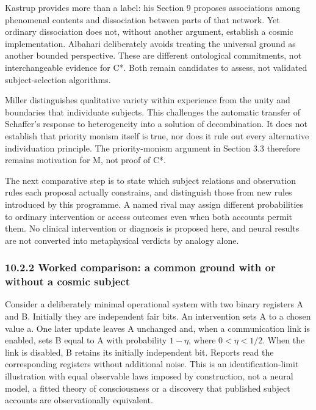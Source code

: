 \documentclass[
  10pt,
  a4paper,
]{article}
\begin{document}
Kastrup provides more than a label: his Section 9 proposes associations
among phenomenal contents and dissociation between parts of that
network. Yet ordinary dissociation does not, without another argument,
establish a cosmic implementation. Albahari deliberately avoids treating
the universal ground as another bounded perspective. These are different
ontological commitments, not interchangeable evidence for C*. Both
remain candidates to assess, not validated subject-selection algorithms.

Miller distinguishes qualitative variety within experience from the
unity and boundaries that individuate subjects. This challenges the
automatic transfer of Schaffer's response to heterogeneity into a
solution of decombination. It does not establish that priority monism
itself is true, nor does it rule out every alternative individuation
principle. The priority-monism argument in Section 3.3 therefore remains
motivation for M, not proof of C*.

The next comparative step is to state which subject relations and
observation rules each proposal actually constrains, and distinguish
those from new rules introduced by this programme. A named rival may
assign different probabilities to ordinary intervention or access
outcomes even when both accounts permit them. No clinical intervention
or diagnosis is proposed here, and neural results are not converted into
metaphysical verdicts by analogy alone.

\subsubsection{10.2.2 Worked comparison: a common ground with or without
a cosmic
subject}\label{worked-comparison-a-common-ground-with-or-without-a-cosmic-subject}

Consider a deliberately minimal operational system with two binary
registers A and B. Initially they are independent fair bits. An
intervention sets A to a chosen value a. One later update leaves A
unchanged and, when a communication link is enabled, sets B equal to A
with probability \(1-\eta\), where \(0<\eta<1/2\). When the link is
disabled, B retains its initially independent bit. Reports read the
corresponding registers without additional noise. This is an
identification-limit illustration with equal observable laws imposed by
construction, not a neural model, a fitted theory of consciousness or a
discovery that published subject accounts are observationally
equivalent.
\end{document}
